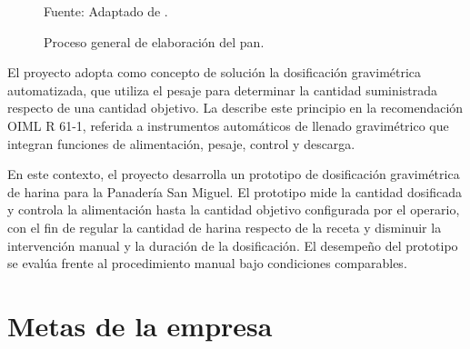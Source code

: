 \begin{figure}[H]
    \centering

    \resizebox{0.95\textwidth}{!}{%
        {\setlength{\fboxsep}{10pt}
        \fbox{%
            
        }}
    }

    \caption{Proceso general de elaboración del pan.}
    \label{fig:proceso_general_pan}

    \vspace{0.2em}
    {\footnotesize Fuente: Adaptado de \textcite{lim2019spc}.}

\end{figure}

El proyecto adopta como concepto de solución la dosificación gravimétrica
automatizada, que utiliza el pesaje para determinar la cantidad suministrada
respecto de una cantidad objetivo. La \textcite{oiml2017r61} describe este
principio en la recomendación OIML R 61-1, referida a instrumentos
automáticos de llenado gravimétrico que integran funciones de alimentación,
pesaje, control y descarga.

En este contexto, el proyecto desarrolla un prototipo de dosificación
gravimétrica de harina para la Panadería San Miguel. El prototipo mide la
cantidad dosificada y controla la alimentación hasta la cantidad objetivo
configurada por el operario, con el fin de regular la cantidad de harina
respecto de la receta y disminuir la intervención manual y la duración de la
dosificación. El desempeño del prototipo se evalúa frente al procedimiento
manual bajo condiciones comparables.


\section{Metas de la empresa}
\label{sec:metas_empresa}

